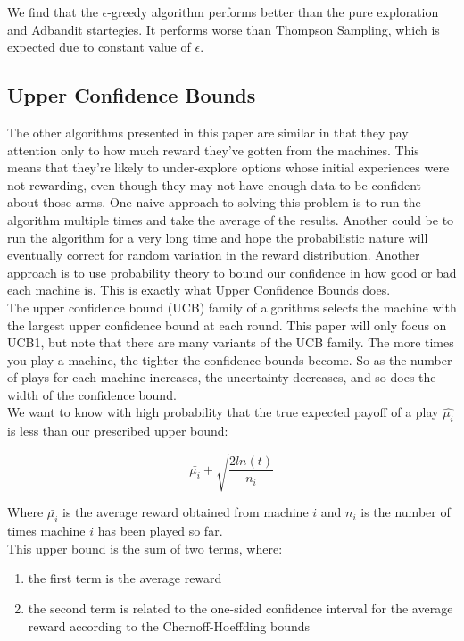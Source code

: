 \documentclass{article}
\begin{document}
We find that the $\epsilon$-greedy algorithm performs better than the pure exploration and Adbandit startegies. It performs worse than Thompson Sampling, which is expected due to constant value of $\epsilon$. 


\subsection{Upper Confidence Bounds}

The other algorithms presented in this paper are similar in that they pay attention only to how much reward they’ve gotten from the machines. This means that they're likely to under-explore options whose initial experiences were not rewarding, even though they may not have enough data to be confident about those arms. One naive approach to solving this problem is to run the algorithm multiple times and take the average of the results. Another could be to run the algorithm for a very long time and hope the probabilistic nature will eventually correct for random variation in the reward distribution. Another approach is to use probability theory to bound our confidence in how good or bad each machine is. This is exactly what Upper Confidence Bounds does.\\

The upper confidence bound (UCB) family of algorithms selects the machine with the largest upper confidence bound at each round. This paper will only focus on UCB1, but note that there are many variants of the UCB family. The more times you play a machine, the tighter the confidence bounds become. So as the number of plays for each machine increases, the uncertainty decreases, and so does the width of the confidence bound.\\

We want to know with high probability that the true expected payoff of a play $\hat{\mu_i}$ is less than our prescribed upper bound:

$$\bar{\mu_{i}} + \sqrt{\frac{2 ln (t)}{n_i}}$$

Where $\bar{\mu_{i}}$ is the average reward obtained from machine $i$ and $n_i$ is the number of times machine $i$ has been played so far.\\

This upper bound is the sum of two terms, where:

\begin{enumerate}
\item the first term is the average reward
\item the second term is related to the one-sided confidence interval for the average reward according to the Chernoff-Hoeffding bounds
\end{enumerate}
\end{document}

